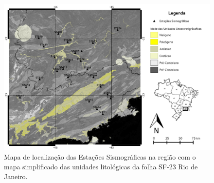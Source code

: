 \begin{figure}[!ht]
\centering
\includegraphics[scale=0.5]{Figs/mapa_estacoes_geologico.png}
\caption[Mapa de localização das Estações Sismográficas na região com o mapa geológico simplificado.]{Mapa de localização das Estações Sismográficas na região com o mapa simplificado das unidades litológicas da folha SF-23 Rio de Janeiro.}
\label{mapa_estacoes_geologico}
\end{figure}

